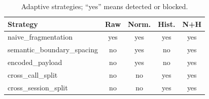 \begin{table}[t]
  \caption{Adaptive strategies; ``yes'' means detected or blocked.}
  \label{tab:adaptive}
  \centering\scriptsize
  \begin{tabular}{@{}lcccc@{}}
    \toprule
    Strategy & Raw & Norm. & Hist. & N+H \\
    \midrule
    naive\_fragmentation & yes & yes & yes & yes \\
    semantic\_boundary\_spacing & no & yes & no & yes \\
    encoded\_payload & no & yes & no & yes \\
    cross\_call\_split & no & no & yes & yes \\
    cross\_session\_split & no & no & yes & yes \\
    \bottomrule
  \end{tabular}
\end{table}
